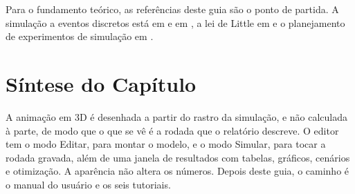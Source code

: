 Para o fundamento teórico, as referências deste guia são o ponto de partida. A simulação a eventos discretos está em \textcite{law2015} e em \textcite{banks2010}, a lei de Little em \textcite{little1961} e o planejamento de experimentos de simulação em \textcite{kleijnen2008}.

\section{Síntese do Capítulo}

\begin{sintese}
A animação em 3D é desenhada a partir do rastro da simulação, e não calculada à parte, de modo que o que se vê é a rodada que o relatório descreve. O editor tem o modo Editar, para montar o modelo, e o modo Simular, para tocar a rodada gravada, além de uma janela de resultados com tabelas, gráficos, cenários e otimização. A aparência não altera os números. Depois deste guia, o caminho é o manual do usuário e os seis tutoriais.
\end{sintese}
